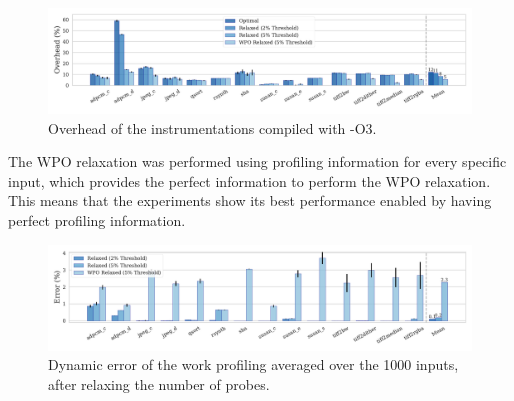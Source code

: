 \begin{figure}[ht]
    \centering
    \includegraphics[width=\textwidth]{figs/overhead-O3.pdf}
    \caption{Overhead of the instrumentations compiled with {\flagstype -O3}.}
    \label{fig:overhead-O3}
\end{figure}

The WPO relaxation was performed using profiling information for every specific input, which provides the perfect information to perform the WPO relaxation.
This means that the experiments show its best performance enabled by having perfect profiling information.


\begin{figure}[h!]
    \centering
    \includegraphics[width=\textwidth]{figs/error-O3.pdf}
    \caption{Dynamic error of the work profiling averaged over the 1000 inputs, after relaxing the number of probes.}
    \label{fig:error-O3}
\end{figure}



